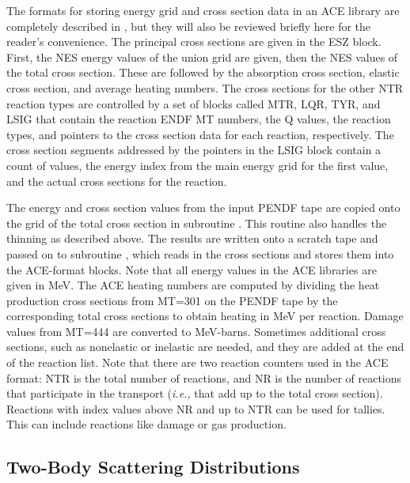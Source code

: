 The formats for storing energy grid and cross section data in an ACE
library are completely described in \cite{ACEFormat},
but they will also be reviewed briefly here for the
reader's convenience.  The principal cross sections are given in the
ESZ block.  First, the NES energy values of the union grid are given,
then the NES values of the total cross section.  These are followed
by the absorption cross section, elastic cross section, and average
heating numbers.  The cross sections for the other NTR reaction types
are controlled by a set of blocks called MTR, LQR, TYR, and LSIG that
contain the reaction ENDF MT numbers, the Q values, the reaction
types, and pointers to the cross section data for each reaction,
respectively.  The cross section segments addressed by the pointers in
the LSIG block contain a count of values, the energy index from the
main energy grid for the first value, and the actual cross sections
for the reaction.

The energy and cross section values from the input PENDF tape are
copied onto the grid of the total cross section in subroutine
 .  This routine also
handles the thinning as described above.  The results are written
onto a scratch tape and passed on to subroutine
, which reads in the
cross sections and stores them into the ACE-format blocks.  Note
that all energy values in the ACE libraries are given in MeV.  The
ACE heating numbers are computed by dividing the heat production
cross sections from MT=301 on the PENDF tape by the corresponding
total cross sections to obtain heating in MeV per reaction.  Damage
values from MT=444 are converted to MeV-barns.  Sometimes additional
cross sections, such as nonelastic or inelastic are needed, and
they are added at the end of the reaction list.  Note that there
are two reaction counters used in the ACE format: NTR is the total
number of reactions, and NR is the number of reactions that
participate in the transport ({\it i.e.,} that add up to the
total cross section).  Reactions with index values above NR and
up to NTR can be used for tallies.  This can include reactions like
damage or gas production.

\subsection{Two-Body Scattering Distributions}
\label{ssACER_2body_scat}

